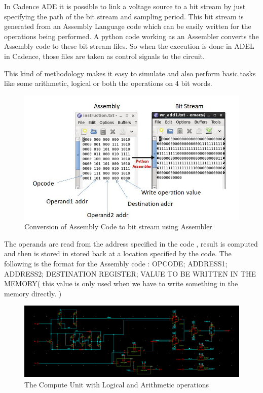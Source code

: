 In Cadence ADE it is possible to link a voltage source to a bit stream by just specifying the path of the bit stream and sampling period. This bit stream is generated from an Assembly Language code which can be easily written for the operations being performed. A python code working as an Assembler converts the Assembly code to these bit stream files. So when the execution is done in ADEL in Cadence, those files are taken as control signals to the circuit. 

This kind of methodology makes it easy to simulate and also perform basic tasks like some arithmetic, logical or both the operations on 4 bit words.

\begin{figure}[H]
\centering
\includegraphics[width=1.0\textwidth]{simulation.JPG}
\caption{Conversion of Assembly Code to bit stream using Assembler}
\label{fig:Figure}
\end{figure}

The operands are read from the address specified in the code , result is computed and then is stored in stored back at a location specified by the code. The following is the format for the Assembly code : OPCODE; ADDRESS1; ADDRESS2; DESTINATION REGISTER; VALUE TO BE WRITTEN IN THE MEMORY( this value is only used when we have to write something in the memory directly. ) 

\begin{figure}[H]
\centering
\includegraphics[width=1.0\textwidth]{complete_compute_unit.png}
\caption{The Compute Unit with Logical and Arithmetic operations}
\label{fig:Figure}
\end{figure}

